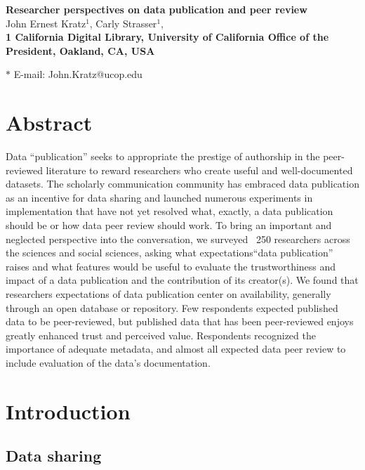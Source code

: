 \documentclass[10pt]{article}
\date{}
\begin{document}
\begin{flushleft}
{\Large
\textbf{Researcher perspectives on data publication and peer review}
}
\\
John Ernest Kratz$^{1}$, 
Carly Strasser$^{1}$, 
\\
\bf{1} California Digital Library, University of California Office of the President, Oakland, CA, USA

$\ast$ E-mail: John.Kratz@ucop.edu
\end{flushleft}


\section*{Abstract}

Data ``publication'' seeks to appropriate the prestige of authorship in the peer-reviewed literature to reward researchers who create useful and well-documented datasets. 
The scholarly communication community has embraced data publication as an incentive for data sharing and launched numerous experiments in implementation that have not yet resolved what, exactly, a data publication should be or how data peer review should work. 
To bring an important and neglected perspective into the conversation, we surveyed ~250 researchers across the sciences and social sciences, asking what expectations``data publication'' raises and what features would be useful to evaluate the trustworthiness and impact of a data publication and the contribution of its creator(s).  
We found that researchers expectations of data publication center on availability, generally through an open database or repository.
Few respondents expected published data to be peer-reviewed, but published data that has been peer-reviewed enjoys greatly enhanced trust and perceived value.
Respondents recognized the importance of adequate metadata, and almost all expected data peer review to include evaluation of the data's documentation.


\section*{Introduction}

\subsection*{Data sharing}
\end{document}
